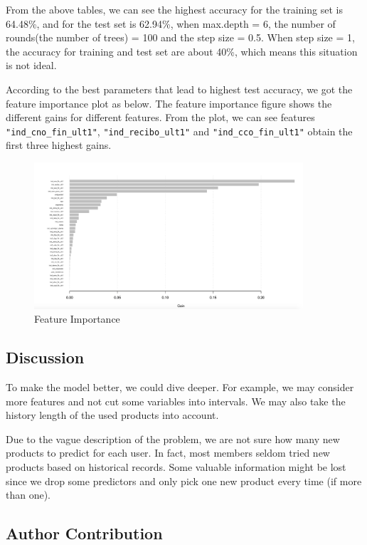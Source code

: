 \documentclass{article}
\begin{document}
\begin{spacing}{1}
\begin{large}
\noindent \indent From the above tables, we can see the highest accuracy for the training set is 64.48\%, and for the test set is 62.94\%, when max.depth = 6, the number of rounds(the number of trees) = 100 and the step size = 0.5.  When step size = 1, the accuracy for training and test set are about 40\%, which means this situation is not ideal.

\noindent \indent According to the best parameters that lead to highest test accuracy, we got the feature importance plot  as below. The feature importance figure shows the different gains for different features. From the plot, we can see features \verb|"ind_cno_fin_ult1"|, \verb|"ind_recibo_ult1"| and \verb|"ind_cco_fin_ult1"| obtain the first three highest gains.

\begin{figure}[H]
\centering
\includegraphics[width = 100mm]{113.png}
\caption{Feature Importance}
\end{figure}

\subsection{Discussion}

To make the model better, we could dive deeper. For example, we may consider more features and not cut some variables into intervals. We may also take the history length of the used products into account.

Due to the vague description of the problem, we are not sure how many new products to predict for each user. In fact, most members seldom tried new products based on historical records. Some valuable information might be lost since we drop some predictors and only pick one new product every time (if more than one).


\subsection{Author Contribution}


\end{large}
\end{spacing}
\end{document}
